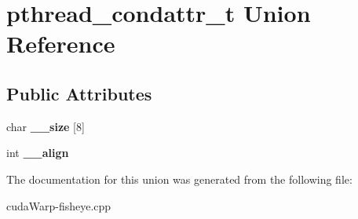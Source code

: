 \hypertarget{unionpthread__condattr__t}{}\section{pthread\+\_\+condattr\+\_\+t Union Reference}
\label{unionpthread__condattr__t}
\subsection*{Public Attributes}
\begin{DoxyCompactItemize}
\item 
char {\bfseries \+\_\+\+\_\+size} \mbox{[}8\mbox{]}\hypertarget{unionpthread__condattr__t_adfc342a3af2f55c278262e6ee1bfef7c}{}\label{unionpthread__condattr__t_adfc342a3af2f55c278262e6ee1bfef7c}

\item 
int {\bfseries \+\_\+\+\_\+align}\hypertarget{unionpthread__condattr__t_ab8450ff960dfe7de672a9564b3cb0642}{}\label{unionpthread__condattr__t_ab8450ff960dfe7de672a9564b3cb0642}

\end{DoxyCompactItemize}


The documentation for this union was generated from the following file\+:\begin{DoxyCompactItemize}
\item 
cuda\+Warp-\/fisheye.\+cpp\end{DoxyCompactItemize}
